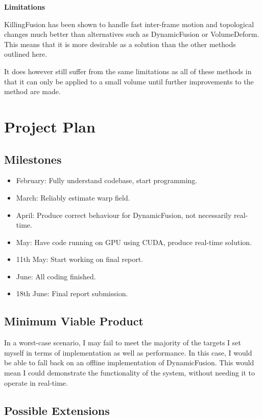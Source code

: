 \documentclass[a4paper]{article}
\begin{document}
\noindent\textbf{Limitations}

KillingFusion has been shown to handle fast inter-frame motion and topological changes much better than alternatives such as DynamicFusion or VolumeDeform. This means that it is more desirable as a solution than the other methods outlined here.

It does however still suffer from the same limitations as all of these methods in that it can only be applied to a small volume until further improvements to the method are made.

\section{Project Plan}

\subsection{Milestones}
\begin{itemize}
\item February: Fully understand codebase, start programming.
\item March: Reliably estimate warp field.
\item April: Produce correct behaviour for DynamicFusion, not necessarily real-time.
\item May: Have code running on GPU using CUDA, produce real-time solution.
\item 11th May: Start working on final report.
\item June: All coding finished.
\item 18th June: Final report submission.
\end{itemize}

\subsection{Minimum Viable Product}

In a worst-case scenario, I may fail to meet the majority of the targets I set myself in terms of implementation as well as performance. In this case, I would be able to fall back on an offline implementation of DynamicFusion. This would mean I could demonstrate the functionality of the system, without needing it to operate in real-time.

\subsection{Possible Extensions}
\end{document}
